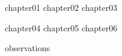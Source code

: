 \documentclass[
bibfile=\ResourcePath./references
]{hunterthesis}
\begin{document}
\ThesisFrontmatter%

{chapter01}
{chapter02}
{chapter03}
{chapter04}
{chapter05}
{chapter06}

\begin{ThesisBackmatter}
{observations}
\end{ThesisBackmatter}
\end{document}
